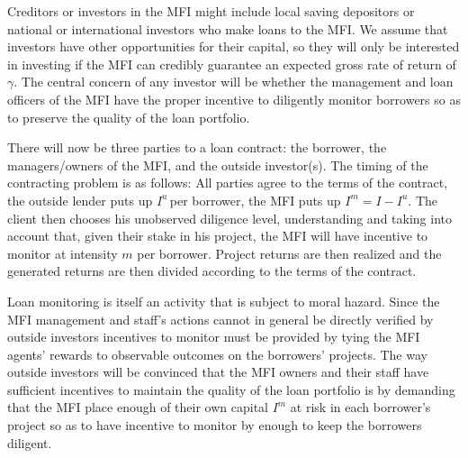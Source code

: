 \documentclass{article} %
\begin{document}
Creditors or investors in the MFI might include local saving depositors or national or international investors who make loans to the MFI.   We assume that investors have other opportunities for their capital, so they will only be interested in investing if the MFI can credibly guarantee an expected gross rate of return of $\gamma $.  The central concern of any investor will be whether the management and loan officers of the MFI have the proper incentive to diligently monitor borrowers so as to preserve the quality of the loan portfolio. 

There will now be three parties to a loan contract: the borrower, the managers/owners of the MFI, and the outside investor(s).  The timing of the contracting problem is as follows: All parties agree to the terms of the contract, the outside lender puts up $I^{u} \, $per borrower, the MFI puts up $I^{m} =I-I^{u} .$ The client then chooses his unobserved diligence level, understanding and taking into account that, given their stake in his project, the MFI will have incentive to monitor at intensity $m$ per borrower. Project returns are then realized and the generated returns are then divided according to the terms of the contract. 

Loan monitoring is itself an activity that is subject to moral hazard.  Since the MFI management and staff's actions cannot in general be directly verified by outside investors incentives to monitor must be provided by tying the MFI agents' rewards to observable outcomes on the borrowers' projects.  The way outside investors will be convinced that the MFI owners and their staff have sufficient incentives to maintain the quality of the loan portfolio is by demanding that the MFI place enough of their own capital $I^{m} $ at risk in each borrower's project so as to have incentive to monitor by enough to keep the borrowers diligent. 
\end{document}
